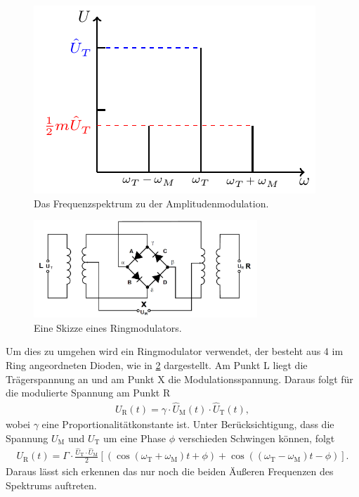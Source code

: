 \begin{figure}
	\centering
	\includegraphics[width =\textwidth/2]{../Grafiken/tikz/tikz-Frequenzspektrum.pdf}
	\caption{Das Frequenzspektrum zu der Amplitudenmodulation.\label{fig:Frequenzspektrum} }
\end{figure}
\newpage
\begin{figure}
	\centering
	\includegraphics[width = 0.75\textwidth]{../Grafiken/Ringmodulator.pdf}
	\caption{Eine Skizze eines Ringmodulators.\cite{V59}\label{fig:Ringmodulator}}
\end{figure}
Um dies zu umgehen wird ein Ringmodulator verwendet, der besteht aus 4 im Ring angeordneten Dioden, wie in \cref{fig:Ringmodulator} dargestellt.
Am Punkt L liegt die Trägerspannung an und am Punkt X die Modulationsspannung.
Daraus folgt für die modulierte Spannung am Punkt R
\begin{align}
	U_\text{R}(t)=\gamma\cdot \hat U_\text{M}(t) \cdot\hat U_\text{T}(t),
\end{align}
wobei $\gamma$ eine Proportionalitätkonstante ist. Unter Berücksichtigung, dass die Spannung $U_\text{M}$ und $U_\text{T}$ um eine Phase $\phi$ verschieden Schwingen können, folgt
\begin{align}
	U_\text{R}(t)=\Gamma\cdot \frac{\hat U_\text{T}\cdot\hat U_\text{M}}{2}\left[ \left(\cos\left(\omega_\text{T}+\omega_\text{M}\right)t+\phi\right) +\cos\left(\left(\omega_\text{T}-\omega_\text{M}\right)t-\phi\right) \right].
\end{align}
Daraus lässt sich erkennen das nur noch die beiden Äußeren Frequenzen des Spektrums auftreten.

